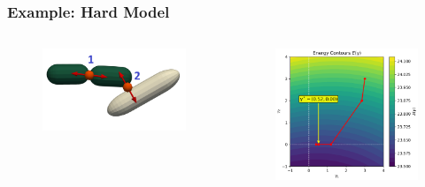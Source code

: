 \documentclass[10pt,t]{beamer}
\begin{document}
\begin{frame}
    \frametitle{Example: Hard Model}

    \vspace{-0.5cm}
    \begin{columns}[c]
        \begin{column}{0.4\textwidth}
            \begin{figure}
                \centering
                \includegraphics[width=1\textwidth]{figures/constraints_example_small.jpeg}
            \end{figure}
        \end{column}

        \begin{column}{0.65\textwidth}
            \begin{figure}
                \centering
                \includegraphics[width=1\textwidth]{figures/energy_surface_contours.png}
            \end{figure}
        \end{column}
    \end{columns}

\end{frame}
\end{document}
